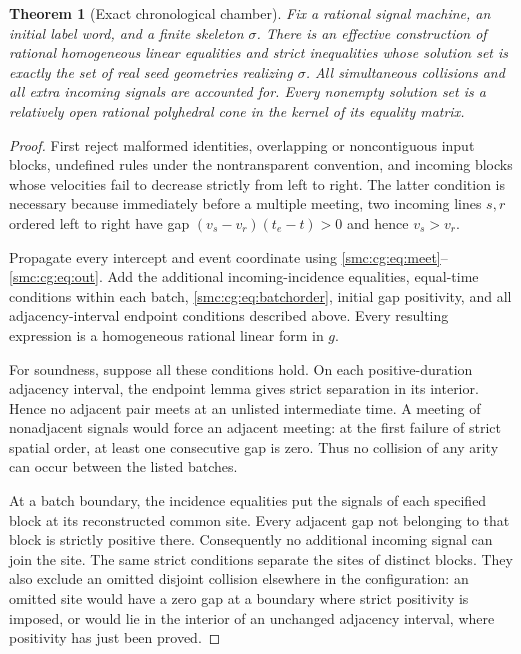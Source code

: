 \documentclass[11pt,letterpaper]{article}
\numberwithin{equation}{section}
\newtheorem{theorem}{Theorem}[section]
\theoremstyle{definition}
\theoremstyle{remark}
\begin{document}
\begin{theorem}[Exact chronological chamber]
\label{smc:cg:thm:chamber}
Fix a rational signal machine, an initial label word, and a finite skeleton
$\sigma$. There is an effective construction of rational homogeneous linear
equalities and strict inequalities whose solution set is exactly the set of
real seed geometries realizing $\sigma$. All simultaneous collisions and all
extra incoming signals are accounted for. Every nonempty solution set is a
relatively open rational polyhedral cone in the kernel of its equality
matrix.
\end{theorem}
\begin{proof}
First reject malformed identities, overlapping or noncontiguous input
blocks, undefined rules under the nontransparent convention, and incoming
blocks whose velocities fail to decrease strictly from left to right.
The latter condition is necessary because immediately before a multiple
meeting, two incoming lines $s,r$ ordered left to right have gap
$(v_s-v_r)(t_e-t)>0$ and hence $v_s>v_r$.

Propagate every intercept and event coordinate using
\eqref{smc:cg:eq:meet}--\eqref{smc:cg:eq:out}. Add the additional incoming-incidence
equalities, equal-time conditions within each batch,
\eqref{smc:cg:eq:batchorder}, initial gap positivity, and all adjacency-interval
endpoint conditions described above. Every resulting expression is a
homogeneous rational linear form in $g$.

For soundness, suppose all these conditions hold. On each positive-duration
adjacency interval, the endpoint lemma gives strict separation in its
interior. Hence no adjacent pair meets at an unlisted intermediate time.
A meeting of nonadjacent signals would force an adjacent meeting: at the
first failure of strict spatial order, at least one consecutive gap is zero.
Thus no collision of any arity can occur between the listed batches.

At a batch boundary, the incidence equalities put the signals of each
specified block at its reconstructed common site. Every adjacent gap not
belonging to that block is strictly positive there. Consequently no additional
incoming signal can join the site. The same strict conditions separate the
sites of distinct blocks. They also exclude an omitted disjoint collision
elsewhere in the configuration: an omitted site would have a zero gap at a
boundary where strict positivity is imposed, or would lie in the interior of
an unchanged adjacency interval, where positivity has just been proved.


\end{proof}
\end{document}
